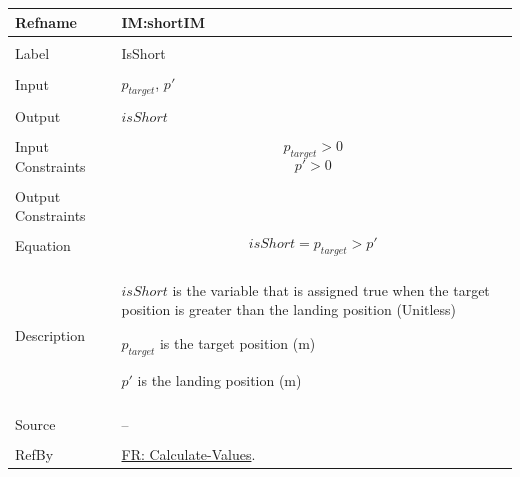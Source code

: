 \documentclass[12pt]{article}
\begin{document}
\noindent \begin{minipage}{\textwidth}
\begin{tabular}{p{} p{}}
\toprule \textbf{Refname} & \textbf{IM:shortIM}
\label{IM:shortIM}
\\ \midrule \\
Label & IsShort
\\ \midrule \\
Input & ${p_{target}}$, $p'$
\\ \midrule \\
Output & $isShort$
\\ \midrule \\
Input Constraints & \begin{displaymath}
                    {p_{target}}>0
                    \end{displaymath}
                    \begin{displaymath}
                    p'>0
                    \end{displaymath}
\\ \midrule \\
Output Constraints & 
\\ \midrule \\
Equation & \begin{displaymath}
           isShort={p_{target}}>p'
           \end{displaymath}
\\ \midrule \\
Description & \begin{symbDescription}
              \item{$isShort$ is the variable that is assigned true when the target position is greater than the landing position (Unitless)}
              \item{${p_{target}}$ is the target position (m)}
              \item{$p'$ is the landing position (m)}
              \end{symbDescription}
\\ \midrule \\
Source & --
\\ \midrule \\
RefBy & \hyperref[calcValues]{FR: Calculate-Values}.
\\ \bottomrule \end{tabular}
\end{minipage}
\par~
\end{document}
